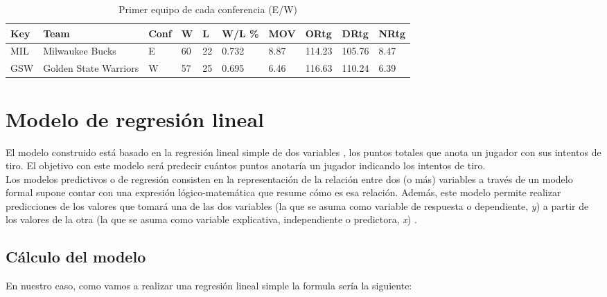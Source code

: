\documentclass[11pt]{diazessay} %
\begin{document}
\begin{table}[!h]
	\centering
	\begin{tabular}{|l|l|l|l|l|l|l|l|l|l|}
		\hline
		\textbf{Key} & \textbf{Team}         & \textbf{Conf} & \textbf{W} & \textbf{L} & \textbf{W/L \%} & \textbf{MOV} & \textbf{ORtg} & \textbf{DRtg} & \textbf{NRtg} \\ \hline
		MIL          & Milwaukee Bucks       & E             & 60         & 22         & 0.732           & 8.87         & 114.23        & 105.76        & 8.47          \\ \hline
		GSW          & Golden State Warriors & W             & 57         & 25         & 0.695           & 6.46         & 116.63        & 110.24        & 6.39          \\ \hline
	\end{tabular}
	\caption{Primer equipo de cada conferencia (E/W)}
	\label{teamConf}
\end{table}

\clearpage

\section*{Modelo de regresión lineal}
El modelo construido está basado en la regresión lineal simple de dos variables \cite{regresion}, los puntos totales que anota un jugador con sus intentos de tiro. El objetivo con este modelo será predecir cuántos puntos anotaría un jugador indicando los intentos de tiro.\\

Los modelos predictivos o de regresión consisten en la representación de la relación entre dos (o más) variables a través de un modelo formal supone contar con una expresión lógico-matemática que resume cómo es esa relación. Además, este modelo permite realizar predicciones de los valores que tomará una de las dos variables (la que se asuma como variable de respuesta o dependiente, \textit{y}) a partir de los valores de la otra (la que se asuma como variable explicativa, independiente o predictora, \textit{x}) \cite{modelo_regresion}.\\

\subsection*{Cálculo del modelo}

En nuestro caso, como vamos a realizar una regresión lineal simple la formula sería la siguiente:\\
\end{document}
